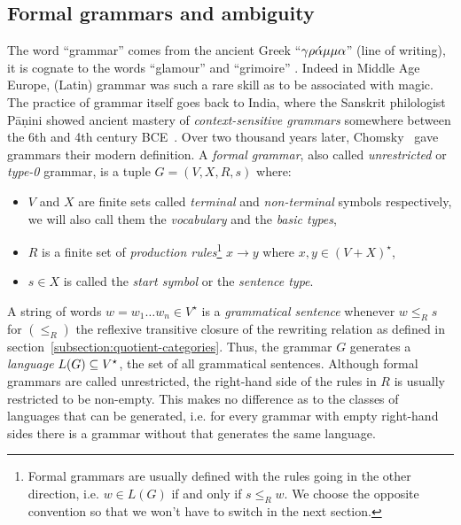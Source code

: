 
\subsection{Formal grammars and ambiguity}

The word ``grammar'' comes from the ancient Greek ``$\rm{\gamma \rho\acute{\alpha}\mu\mu\alpha}$'' (line of writing), it is cognate to the words ``glamour'' and ``grimoire'' \cite{RuppliThorel05, Davies10, Lambek14}.
Indeed in Middle Age Europe, (Latin) grammar was such a rare skill as to be associated with magic.
The practice of grammar itself goes back to India, where the Sanskrit philologist P\={a}\d{n}ini showed ancient mastery of \emph{context-sensitive grammars} somewhere between the 6th and 4th century BCE~\cite{BhateKak93}.
Over two thousand years later, Chomsky~\cite{Chomsky56,Chomsky57} gave grammars their modern definition.
A \emph{formal grammar}, also called \emph{unrestricted} or \emph{type-0} grammar, is a tuple $G = (V, X, R, s)$ where:
\begin{itemize}
    \item $V$ and $X$ are finite sets called \emph{terminal} and \emph{non-terminal} symbols respectively, we will also call them the \emph{vocabulary} and the \emph{basic types},
    \item $R$ is a finite set of \emph{production rules}\footnote
    {Formal grammars are usually defined with the rules going in the other direction, i.e. $w \in L(G)$ if and only if $s \leq_R w$.
    We choose the opposite convention so that we won't have to switch in the next section.} $x \to y$ where $x, y \in (V + X)^\star$,
    \item $s \in X$ is called the \emph{start symbol} or the \emph{sentence type}.
\end{itemize}
A string of words $w = w_1 \dots w_n \in V^\star$ is a \emph{grammatical sentence} whenever $w \leq_R s$
for $(\leq_R)$ the reflexive transitive closure of the rewriting relation as defined in section~\ref{subsection:quotient-categories}.
Thus, the grammar $G$ generates a \emph{language} $L(G) \subseteq V^\star$, the set of all grammatical sentences.
Although formal grammars are called unrestricted, the right-hand side of the rules in $R$ is usually restricted to be non-empty.
This makes no difference as to the classes of languages that can be generated, i.e. for every grammar with empty right-hand sides there is a grammar without that generates the same language.

